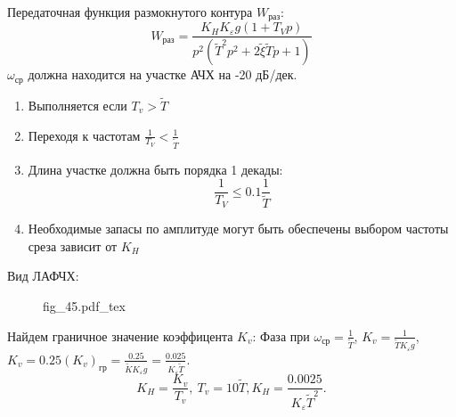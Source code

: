 \documentclass{article}
\newcommand{\incfig}[1]{
    {#1.pdf_tex}
}
\begin{document}
Передаточная функция размокнутого контура $W_{раз}$:
\[
    W_{раз}  = \frac{K_H K_\varepsilon g (1 + T_V p)}{p^2 (\tilde{T}^2 p^2 + 2 \tilde{\xi} \tilde{T}p + 1)}
\]
$\omega_{ср}$ должна находится на участке АЧХ на -20 дБ/дек.
\begin{enumerate}
\item Выполняется если $T_v > \tilde{T}$
\item Переходя к частотам $\frac{1}{T_V} < \frac{1}{\tilde{T}}$
\item Длина участке должна быть порядка 1 декады:
\[
\frac{1}{T_V} \le 0.1 \frac{1}{\tilde{T}}
\]
\item Необходимые запасы по амплитуде могут быть обеспечены выбором частоты среза зависит от $K_H$
\end{enumerate}
Вид ЛАФЧХ:
\begin{figure}[H]
    \centering
    \incfig{fig_45}
    \label{fig:fig_45}
\end{figure}

Найдем граничное значение коэффицента $K_v$:
Фаза при $\omega_{ср} = \frac{1}{\tilde{T}} $, $K_v = \frac{1}{\tilde{T} K_\varepsilon g}$, $K_v = 0.25 (K_v)_{гр} = \frac{0.25}{\tilde{K}  K_\varepsilon g} = \frac{0.025}{K_\varepsilon \tilde{T}}$.
\[
    K_H = \frac{K_v}{T_v}, \ T_v = 10 \tilde{T}, K_H = \frac{0.0025}{K_\varepsilon \tilde{T}^2} 
.\]
\end{document}
